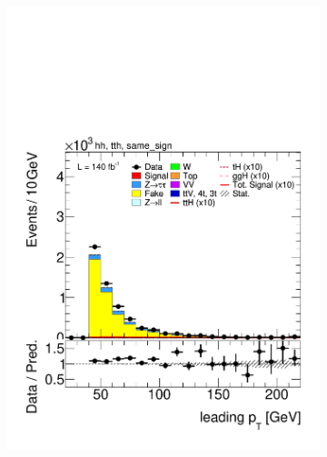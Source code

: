   \begin{figure}[htbp]
    \centering
    \begin{subfigure}[b]{0.45\textwidth}
      \centering
      \includegraphics[width=\textwidth]{images/fakes_run2/plot_tau_0_pt_hh_tth_15_16_17_18_same_sign.pdf}
      \caption{}
    \end{subfigure}
    \hfill
    \begin{subfigure}[b]{0.45\textwidth}
      \centering

\end{subfigure}
\end{figure}
